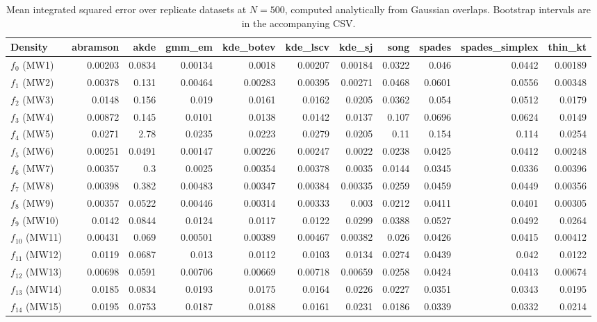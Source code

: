 \begin{table}[htbp]
\centering
\caption{Mean integrated squared error over replicate datasets at $N=500$, computed analytically from Gaussian overlaps. Bootstrap intervals are in the accompanying CSV.}
\label{tab:ise-N500}
\begin{tabular}{lrrrrrrrrrr}
\toprule
Density & abramson & akde & gmm\_em & kde\_botev & kde\_lscv & kde\_sj & song & spades & spades\_simplex & thin\_kt \\
\midrule
$f_{0}$ (MW1) & 0.00203 & 0.0834 & 0.00134 & 0.0018 & 0.00207 & 0.00184 & 0.0322 & 0.046 & 0.0442 & 0.00189 \\
$f_{1}$ (MW2) & 0.00378 & 0.131 & 0.00464 & 0.00283 & 0.00395 & 0.00271 & 0.0468 & 0.0601 & 0.0556 & 0.00348 \\
$f_{2}$ (MW3) & 0.0148 & 0.156 & 0.019 & 0.0161 & 0.0162 & 0.0205 & 0.0362 & 0.054 & 0.0512 & 0.0179 \\
$f_{3}$ (MW4) & 0.00872 & 0.145 & 0.0101 & 0.0138 & 0.0142 & 0.0137 & 0.107 & 0.0696 & 0.0624 & 0.0149 \\
$f_{4}$ (MW5) & 0.0271 & 2.78 & 0.0235 & 0.0223 & 0.0279 & 0.0205 & 0.11 & 0.154 & 0.114 & 0.0254 \\
$f_{5}$ (MW6) & 0.00251 & 0.0491 & 0.00147 & 0.00226 & 0.00247 & 0.0022 & 0.0238 & 0.0425 & 0.0412 & 0.00248 \\
$f_{6}$ (MW7) & 0.00357 & 0.3 & 0.0025 & 0.00354 & 0.00378 & 0.0035 & 0.0144 & 0.0345 & 0.0336 & 0.00396 \\
$f_{7}$ (MW8) & 0.00398 & 0.382 & 0.00483 & 0.00347 & 0.00384 & 0.00335 & 0.0259 & 0.0459 & 0.0449 & 0.00356 \\
$f_{8}$ (MW9) & 0.00357 & 0.0522 & 0.00446 & 0.00314 & 0.00333 & 0.003 & 0.0212 & 0.0411 & 0.0401 & 0.00305 \\
$f_{9}$ (MW10) & 0.0142 & 0.0844 & 0.0124 & 0.0117 & 0.0122 & 0.0299 & 0.0388 & 0.0527 & 0.0492 & 0.0264 \\
$f_{10}$ (MW11) & 0.00431 & 0.069 & 0.00501 & 0.00389 & 0.00467 & 0.00382 & 0.026 & 0.0426 & 0.0415 & 0.00412 \\
$f_{11}$ (MW12) & 0.0119 & 0.0687 & 0.013 & 0.0112 & 0.0103 & 0.0134 & 0.0274 & 0.0439 & 0.042 & 0.0122 \\
$f_{12}$ (MW13) & 0.00698 & 0.0591 & 0.00706 & 0.00669 & 0.00718 & 0.00659 & 0.0258 & 0.0424 & 0.0413 & 0.00674 \\
$f_{13}$ (MW14) & 0.0185 & 0.0834 & 0.0193 & 0.0175 & 0.0164 & 0.0226 & 0.0227 & 0.0351 & 0.0343 & 0.0195 \\
$f_{14}$ (MW15) & 0.0195 & 0.0753 & 0.0187 & 0.0188 & 0.0161 & 0.0231 & 0.0186 & 0.0339 & 0.0332 & 0.0214 \\
\bottomrule
\end{tabular}
\end{table}


